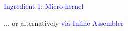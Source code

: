 \documentclass[11pt]{beamer}
\begin{document}
\begin{frame}[fragile]{\textcolor{blue}{Ingredient 1: Micro-kernel}}
\vspace{0.7cm}

\qquad\qquad\qquad\qquad\qquad\qquad\qquad ... or alternatively \textcolor{blue}{via Inline Assembler}

%    
%    
%    
%    
%    
%    
%    
%    
%    
%    
%
%
%
%
%
%


\end{frame}
\end{document}
